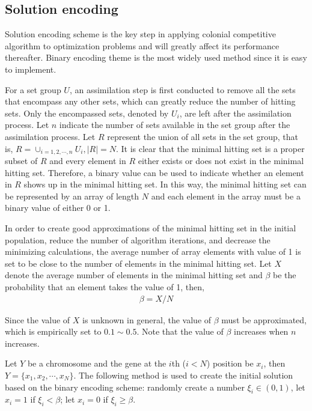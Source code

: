 \subsection{Solution encoding}
Solution encoding scheme is the key step in applying colonial competitive algorithm to optimization problems and will greatly affect its performance thereafter.
Binary encoding theme is the most widely used method since it is easy to implement.

For a set group $U$, an assimilation step is first conducted to remove all the sets that encompass any other sets, which can greatly reduce the number of hitting sets.
Only the encompassed sets, denoted by $U_i$, are left after the assimilation process. 
Let $n$ indicate the number of sets available in the set group after the assimilation process.
Let $R$ represent the union of all sets in the set group, that is, $R = \cup_{i = 1, 2, \cdots, n}U_i, |R| = N$.
It is clear that the minimal hitting set is a proper subset of $R$ and every element in $R$ either exists or does not exist in the minimal hitting set.
Therefore, a binary value can be used to indicate whether an element in $R$ shows up in the minimal hitting set.
In this way, the minimal hitting set can be represented by an array of length $N$ and each element in the array must be a binary value of either 0 or 1.

In order to create good approximations of the minimal hitting set in the initial population, reduce the number of algorithm iterations, and decrease the minimizing calculations, the average number of array elements with value of 1 is set to be close to the number of elements in the minimal hitting set.
Let $X$ denote the average number of elements in the minimal hitting set and $\beta$ be the probability that an element takes the value of 1, then,
\begin{align}
	\beta = X / N
\end{align}

Since the value of $X$ is unknown in general, the value of $\beta$ must be approximated, which is empirically set to $0.1 \sim 0.5$.
Note that the value of $\beta$ increases when $n$ increases.

Let $Y$ be a chromosome and the gene at the $i$th ($i < N$) position be $x_i$, then $Y = \{x_1, x_2, \cdots, x_N\}$.
The following method is used to create the initial solution based on the binary encoding scheme:
randomly create a number $\xi_i \in (0, 1)$, let $x_i = 1$ if $\xi_i < \beta$; let $x_i = 0$ if $\xi_i \geq \beta$.

